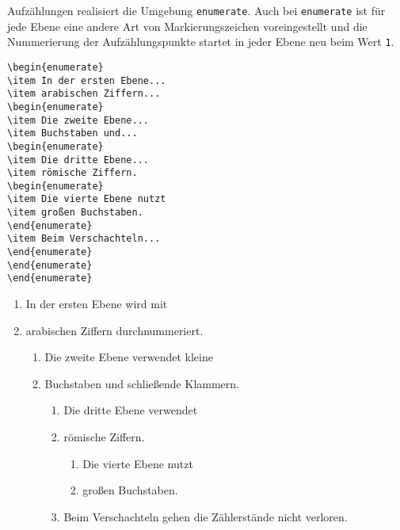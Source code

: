 Aufzählungen realisiert die Umgebung \verb!enumerate!. Auch bei \verb!enumerate! ist für jede Ebene eine andere Art von Markierungszeichen voreingestellt und die Nummerierung der Aufzählungspunkte startet in jeder Ebene neu beim Wert \verb!1!.

\begin{minipage}[h]{0.44\textwidth}
\setlength{\parskip}{1em}
\frenchspacing
\begin{Verbatim}[frame=single]
\begin{enumerate}
\item In der ersten Ebene...
\item arabischen Ziffern...
\begin{enumerate}
\item Die zweite Ebene...
\item Buchstaben und...
\begin{enumerate}
\item Die dritte Ebene...
\item römische Ziffern.
\begin{enumerate}
\item Die vierte Ebene nutzt 
\item großen Buchstaben.
\end{enumerate}
\item Beim Verschachteln...
\end{enumerate}
\end{enumerate}
\end{enumerate}
\end{Verbatim}
\end{minipage}
\hfill
\begin{minipage}[h]{0.54\textwidth}
\setlength{\parskip}{1em}
\frenchspacing
\begin{enumerate}
\item In der ersten Ebene wird mit
\item arabischen Ziffern durchnummeriert.
\begin{enumerate}
\item Die zweite Ebene verwendet kleine
\item Buchstaben und schließende Klammern.
\begin{enumerate}
\item Die dritte Ebene verwendet
\item römische Ziffern.
\begin{enumerate}
\item Die vierte Ebene nutzt 
\item großen Buchstaben.
\end{enumerate}
\item Beim Verschachteln gehen die Zählerstände nicht verloren.
\end{enumerate}
\end{enumerate}
\end{enumerate}
\end{minipage}


